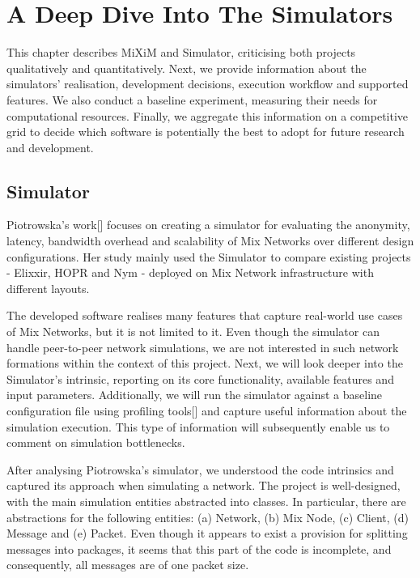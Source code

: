 \documentclass[logo,msc,cyber]{infthesis}   %
\begin{document}
\chapter{A Deep Dive Into The Simulators}

This chapter describes MiXiM and Simulator, criticising both projects
qualitatively and quantitatively. Next, we provide information about the
simulators' realisation, development decisions, execution workflow and supported
features. We also conduct a baseline experiment, measuring their needs for
computational resources. Finally, we aggregate this information on a competitive
grid to decide which software is potentially the best to adopt for future
research and development. 

\section{Simulator}
Piotrowska's work[] focuses on creating a simulator for evaluating the
anonymity, latency, bandwidth overhead and scalability of Mix Networks over
different design configurations. Her study mainly used the Simulator to compare
existing projects - Elixxir, HOPR and Nym - deployed on Mix Network
infrastructure with different layouts.

The developed software realises many features that capture real-world use cases
of Mix Networks, but it is not limited to it. Even though the simulator can
handle peer-to-peer network simulations, we are not interested in such network
formations within the context of this project. Next, we will look deeper into
the Simulator's intrinsic, reporting on its core functionality, available
features and input parameters. Additionally, we will run the simulator against a
baseline configuration file using profiling tools[] and capture useful
information about the simulation execution. This type of information will
subsequently enable us to comment on simulation bottlenecks.

After analysing Piotrowska's simulator, we understood the code intrinsics and
captured its approach when simulating a network. The project is well-designed,
with the main simulation entities abstracted into classes. In particular, there
are abstractions for the following entities: (a) Network, (b) Mix Node, (c) Client,
(d) Message and (e) Packet. Even though it appears to exist a provision for
splitting messages into packages, it seems that this part of the code is
incomplete, and consequently, all messages are of one packet size.
\end{document}

